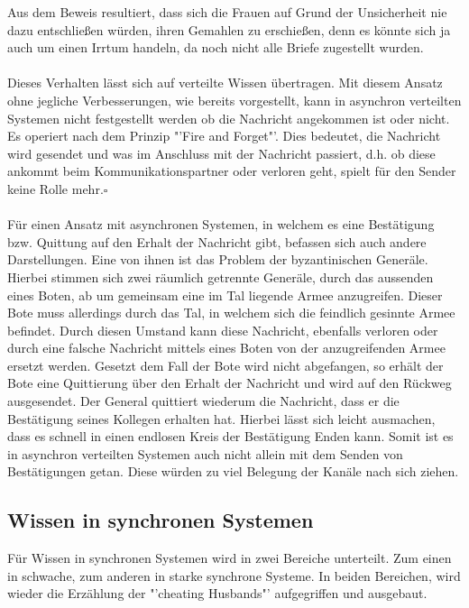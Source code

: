 Aus dem Beweis resultiert, dass sich die Frauen auf Grund der Unsicherheit nie dazu entschließen würden, ihren Gemahlen zu erschießen, denn es könnte sich ja auch um einen Irrtum handeln, da noch nicht alle Briefe zugestellt wurden.\\\\
Dieses Verhalten lässt sich auf verteilte Wissen übertragen. Mit diesem Ansatz ohne jegliche Verbesserungen, wie bereits vorgestellt, kann in asynchron verteilten Systemen nicht festgestellt werden ob die Nachricht angekommen ist oder nicht. Es operiert nach dem Prinzip "'Fire and Forget"'. Dies bedeutet, die Nachricht wird gesendet und was im Anschluss mit der Nachricht passiert, d.h. ob diese ankommt beim Kommunikationspartner oder verloren geht, spielt für den Sender keine Rolle mehr.$\square$\\\\
Für einen Ansatz mit asynchronen Systemen, in welchem es eine Bestätigung bzw. Quittung auf den Erhalt der Nachricht gibt, befassen sich auch andere Darstellungen. Eine von ihnen ist das Problem der byzantinischen Generäle. Hierbei stimmen sich zwei räumlich getrennte Generäle, durch das aussenden eines Boten, ab um gemeinsam eine im Tal liegende Armee anzugreifen. Dieser Bote muss allerdings durch das Tal, in welchem sich die feindlich gesinnte Armee befindet. Durch diesen Umstand kann diese Nachricht, ebenfalls verloren oder durch eine falsche Nachricht mittels eines Boten von der anzugreifenden Armee ersetzt werden. Gesetzt dem Fall der Bote wird nicht abgefangen, so erhält der Bote eine Quittierung über den Erhalt der Nachricht und wird auf den Rückweg ausgesendet. Der General quittiert wiederum die Nachricht, dass er die Bestätigung seines Kollegen erhalten hat. Hierbei lässt sich leicht ausmachen, dass es schnell in einen endlosen Kreis der Bestätigung Enden kann. Somit ist es in asynchron verteilten Systemen auch nicht allein mit dem Senden von Bestätigungen getan. Diese würden zu viel Belegung der Kanäle nach sich ziehen.



\subsection{Wissen in synchronen Systemen}
\label{wissen_sync}
Für Wissen in synchronen Systemen wird in zwei Bereiche unterteilt. Zum einen in schwache, zum anderen in starke synchrone Systeme. In beiden Bereichen, wird wieder die Erzählung der "'cheating Husbands"' aufgegriffen und ausgebaut.
